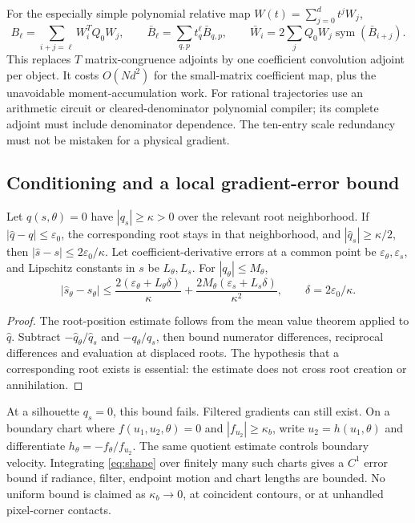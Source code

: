 \documentclass[10pt,letterpaper]{article}
\theoremstyle{remark}\newtheorem{counterexample}[proposition]{Counterexample}
\newcommand{\sym}{\operatorname{sym}}
\newcommand{\eps}{\varepsilon}
\begin{document}
For the especially simple polynomial relative map $W(t)=\sum_{j=0}^dt^jW_j$,
\begin{equation}
 B_\ell=\sum_{i+j=\ell}W_i^TQ_0W_j,\qquad
 \bar B_\ell=\sum_{q,p}t_q^\ell\bar B_{q,p},\qquad
 \bar W_i=2\sum_jQ_0W_j\sym(\bar B_{i+j}). \label{eq:quadmoments}
\end{equation}
This replaces $T$ matrix-congruence adjoints by one coefficient convolution adjoint per object. It costs $O(Nd^2)$ for the small-matrix coefficient map, plus the unavoidable moment-accumulation work. For rational trajectories use an arithmetic circuit or cleared-denominator polynomial compiler; its complete adjoint must include denominator dependence. The ten-entry scale redundancy must not be mistaken for a physical gradient.

\subsection{Conditioning and a local gradient-error bound}
Let $q(s,\theta)=0$ have $|q_s|\geq\kappa>0$ over the relevant root neighborhood. If $|\widehat q-q|\leq\eps_0$, the corresponding root stays in that neighborhood, and $|\widehat q_s|\geq\kappa/2$, then $|\widehat s-s|\leq2\eps_0/\kappa$. Let coefficient-derivative errors at a common point be $\eps_\theta,\eps_s$, and Lipschitz constants in $s$ be $L_\theta,L_s$. For $|q_\theta|\leq M_\theta$,
\begin{equation}
 |\widehat s_\theta-s_\theta|
 \leq \frac{2(\eps_\theta+L_\theta\delta)}{\kappa}
 +\frac{2M_\theta(\eps_s+L_s\delta)}{\kappa^2},\qquad
 \delta=2\eps_0/\kappa. \label{eq:rooterror}
\end{equation}
\begin{proof}
The root-position estimate follows from the mean value theorem applied to $\widehat q$. Subtract $-\widehat q_\theta/\widehat q_s$ and $-q_\theta/q_s$, then bound numerator differences, reciprocal differences and evaluation at displaced roots. The hypothesis that a corresponding root exists is essential: the estimate does not cross root creation or annihilation.
\end{proof}
At a silhouette $q_s=0$, this bound fails. Filtered gradients can still exist. On a boundary chart where $f(u_1,u_2,\theta)=0$ and $|f_{u_2}|\geq\kappa_b$, write $u_2=h(u_1,\theta)$ and differentiate $h_\theta=-f_\theta/f_{u_2}$. The same quotient estimate controls boundary velocity. Integrating \eqref{eq:shape} over finitely many such charts gives a $C^1$ error bound if radiance, filter, endpoint motion and chart lengths are bounded. No uniform bound is claimed as $\kappa_b\to0$, at coincident contours, or at unhandled pixel-corner contacts.
\end{document}
